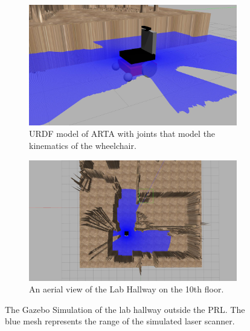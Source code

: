\begin{figure}[ht]
	\begin{subfigure}[b]{.48\textwidth}
		\centering
		\includegraphics[width=1.0\linewidth]{img/chapter6_test/artamodel.jpg}
		\caption{URDF model of ARTA with joints that model the kinematics of the wheelchair.}
	\end{subfigure}%
	\hspace{\fill} 
	\begin{subfigure}[b]{.48\textwidth}
		\centering
		\includegraphics[width=1.0\linewidth]{img/chapter6_test/heightmap.jpg}
		\caption{An aerial view of the Lab Hallway on the 10th floor.}
	\end{subfigure}
	\vspace{-1\baselineskip}
	\begin{center}
		\caption{The Gazebo Simulation of the lab hallway outside the PRL. The blue mesh represents the range of the simulated laser scanner.}
		\label{fig:greenredrender}
	\end{center}
	\vspace{-1\baselineskip}
\end{figure}

